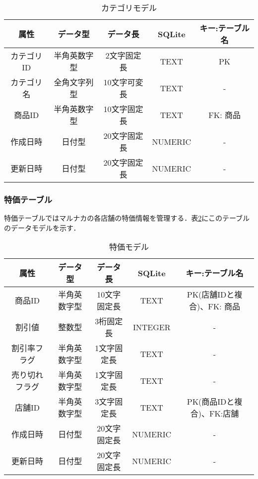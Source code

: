 \documentclass[a4j]{jarticle}
\begin{document}
\begin{table}[H]
\caption{カテゴリモデル}
\label{tab:DB6}
\begin{center}
\begin{tabular}{|c|c|c|c|c|}
\hline
属性　&データ型&データ長&SQLite&キー:テーブル名\\ \hline\hline
カテゴリID &半角英数字型&2文字固定長&TEXT&PK \\ \hline
カテゴリ名&全角文字列型&10文字可変長&TEXT&- \\ \hline
商品ID &半角英数字型&10文字固定長&TEXT&FK: 商品\\ \hline
作成日時  &日付型&20文字固定長&NUMERIC&- \\ \hline
更新日時 &日付型&20文字固定長&NUMERIC& - \\ \hline
\end{tabular}
\end{center}
\end{table}
\subsubsection{特価テーブル}
特価テーブルではマルナカの各店舗の特価情報を管理する．表\ref{tab:DB7}にこのテーブルのデータモデルを示す．
\begin{table}[H]
\caption{特価モデル}
\label{tab:DB7}
\begin{center}
\begin{tabular}{|c|c|c|c|c|}
\hline
属性　&データ型&データ長&SQLite&キー:テーブル名\\ \hline\hline
商品ID &半角英数字型&10文字固定長&TEXT&PK(店舗IDと複合)、FK: 商品\\ \hline
割引値 &整数型&3桁固定長&INTEGER&- \\ \hline
割引率フラグ &半角英数字型&1文字固定長&TEXT&-  \\ \hline
売り切れフラグ&半角英数字型&1文字固定長&TEXT&-  \\ \hline
店舗ID &半角英数字型&3文字固定長&TEXT&PK(商品IDと複合)、FK:店舗 \\ \hline
 作成日時  &日付型&20文字固定長&NUMERIC&- \\ \hline
更新日時 &日付型&20文字固定長&NUMERIC&-  \\ \hline
\end{tabular}
\end{center}
\end{table}
\end{document}
